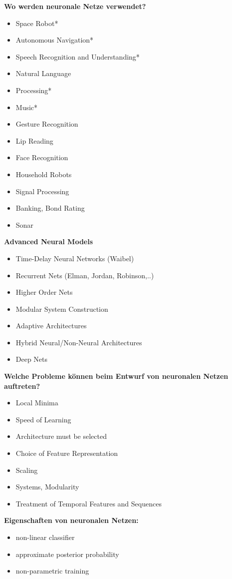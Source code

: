 \textbf{Wo werden neuronale Netze verwendet?}
\begin{itemize}
	\item Space Robot*
	\item Autonomous Navigation*
	\item Speech Recognition and Understanding*
	\item Natural Language
	\item Processing*
	\item Music*
	\item Gesture Recognition
	\item Lip Reading
	\item Face Recognition
	\item Household Robots
	\item Signal Processing
	\item Banking, Bond Rating
	\item Sonar
\end{itemize}
\textbf{Advanced Neural Models}
\begin{itemize}
	\item Time-Delay Neural Networks (Waibel)
	\item Recurrent Nets (Elman, Jordan, Robinson,..)
	\item Higher Order Nets
	\item Modular System Construction
	\item Adaptive Architectures
	\item Hybrid Neural/Non-Neural Architectures
	\item Deep Nets
\end{itemize}
\textbf{Welche Probleme können beim Entwurf von neuronalen Netzen auftreten?}
\begin{itemize}
	\item Local Minima
	\item Speed of Learning
	\item Architecture must be selected
	\item Choice of Feature Representation
	\item Scaling
	\item Systems, Modularity
	\item Treatment of Temporal Features and Sequences
\end{itemize}
\textbf{Eigenschaften von neuronalen Netzen:}
\begin{itemize}
	\item non-linear classifier
	\item approximate posterior probability
	\item non-parametric training
\end{itemize}
\newpage

